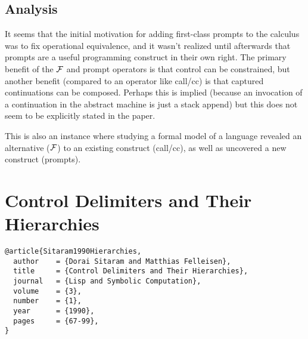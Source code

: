 \documentclass[letterpaper]{llncs}
\begin{document}
\subsection*{Analysis}

It seems that the initial motivation for adding first-class prompts to the calculus was to fix operational equivalence, and it wasn't realized until afterwards that prompts are a useful programming construct in their own right. The primary benefit of the $ \mathcal{F} $ and prompt operators is that control can be constrained, but another benefit (compared to an operator like call/cc) is that captured continuations can be composed. Perhaps this is implied (because an invocation of a continuation in the abstract machine is just a stack append) but this does not seem to be explicitly stated in the paper.

This is also an instance where studying a formal model of a language revealed an alternative ($ \mathcal{F} $) to an existing construct (call/cc), as well as uncovered a new construct (prompts).






\section*{Control Delimiters and Their Hierarchies}%

\begin{verbatim}
@article{Sitaram1990Hierarchies,
  author    = {Dorai Sitaram and Matthias Felleisen},
  title     = {Control Delimiters and Their Hierarchies},
  journal   = {Lisp and Symbolic Computation},
  volume    = {3},
  number    = {1},
  year      = {1990},
  pages     = {67-99},
}
\end{verbatim}

\end{document}
